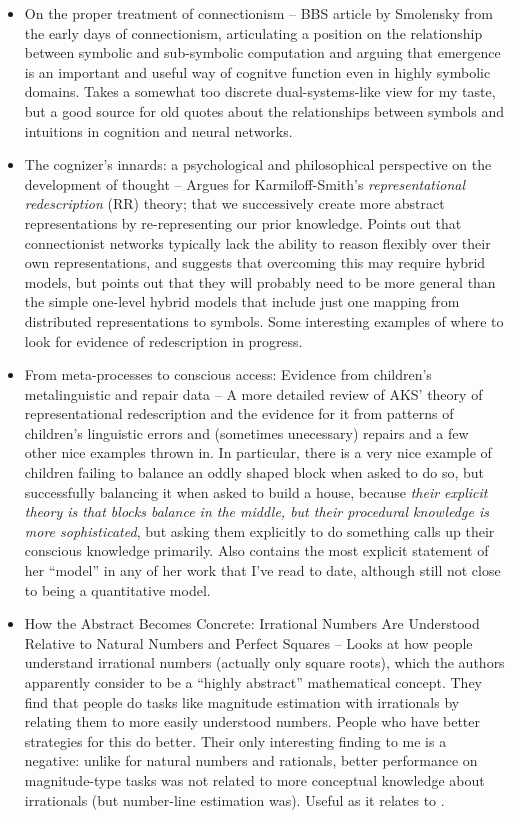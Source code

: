 \documentclass[10pt]{article}
\begin{document}
\begin{itemize}
\item On the proper treatment of connectionism -- BBS article by Smolensky from the early days of connectionism, articulating a position on the relationship between symbolic and sub-symbolic computation and arguing that emergence is an important and useful way of cognitve function even in highly symbolic domains. Takes a somewhat too discrete dual-systems-like view for my taste, but a good source for old quotes about the relationships between symbols and intuitions in cognition and neural networks. \citep{Smolensky1988}
\item The cognizer's innards: a psychological and philosophical perspective on the development of thought -- Argues for Karmiloff-Smith's \emph{representational redescription} (RR) theory; that we successively create more abstract representations by re-representing our prior knowledge. Points out that connectionist networks typically lack the ability to reason flexibly over their own representations, and suggests that overcoming this may require hybrid models, but points out that they will probably need to be more general than the simple one-level hybrid models that include just one mapping from distributed representations to symbols. Some interesting examples of where to look for evidence of redescription in progress. \citep{Clark1993}
\item From meta-processes to conscious access: Evidence from children's metalinguistic and repair data -- A more detailed review of AKS' theory of representational redescription and the evidence for it from patterns of children's linguistic errors and (sometimes unecessary) repairs and a few other nice examples thrown in. In particular, there is a very nice example of children failing to balance an oddly shaped block when asked to do so, but successfully balancing it when asked to build a house, because \emph{their explicit theory is that blocks balance in the middle, but their procedural knowledge is more sophisticated}, but asking them explicitly to do something calls up their conscious knowledge primarily. Also contains the most explicit statement of her ``model'' in any of her work that I've read to date, although still not close to being a quantitative model. \citep{Karmiloff-Smith1986}
\item How the Abstract Becomes Concrete: Irrational Numbers Are Understood Relative to Natural Numbers and Perfect Squares -- Looks at how people understand irrational numbers (actually only square roots), which the authors apparently consider to be a ``highly abstract'' mathematical concept. They find that people do tasks like magnitude estimation with irrationals by relating them to more easily understood numbers. People who have better strategies for this do better. Their only interesting finding to me is a negative: unlike for natural numbers and rationals, better performance on magnitude-type tasks was not related to more conceptual knowledge about irrationals (but number-line estimation was). Useful as it relates to \citep{Wilensky1991}. 

\end{itemize}
\end{document}
